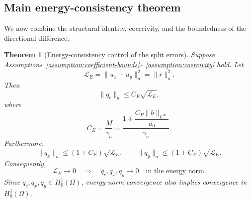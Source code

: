 \documentclass[11pt]{article}
\newtheorem{theorem}{Theorem}
\begin{document}
\subsection{Main energy-consistency theorem}
\label{subsec:main-energy-consistency-theorem}

We now combine the structural identity, coercivity, and the boundedness
of the directional difference.

\begin{theorem}[Energy-consistency control of the split errors]
\label{theorem:energy-consistency-control}
Suppose Assumptions~\ref{assumption:coefficient-bounds}--
\ref{assumption:coercivity} hold.  Let
\[
    \mathcal L_E
    =
    \|u_x-u_y\|_a^2
    =
    \|r\|_a^2.
\]
Then
\begin{equation}
    \|q_c\|_a
    \le
    C_E\sqrt{\mathcal L_E},
    \label{eq:qc-energy-control}
\end{equation}
where
\begin{equation}
    C_E
    =
    \frac{M}{\gamma_a}
    =
    \frac{
    1+\dfrac{C_P\|b\|_{L^\infty}}{a_0}
    }{\gamma_a}.
    \label{eq:CE-definition}
\end{equation}
Furthermore,
\begin{equation}
    \|q_x\|_a
    \le
    (1+C_E)\sqrt{\mathcal L_E},
    \qquad
    \|q_y\|_a
    \le
    (1+C_E)\sqrt{\mathcal L_E}.
    \label{eq:qx-qy-energy-control}
\end{equation}
Consequently,
\begin{equation}
    \mathcal L_E\to0
    \quad\Longrightarrow\quad
    q_c,q_x,q_y\to0
    \quad
    \text{in the energy norm}.
    \label{eq:energy-loss-convergence}
\end{equation}
Since \(q_c,q_x,q_y\in H_0^1(\Omega)\), energy-norm convergence also
implies convergence in \(H_0^1(\Omega)\).
\end{theorem}
\end{document}
